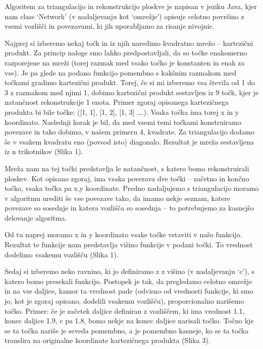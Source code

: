 \documentclass[a4paper,11pt]{article}
\begin{document}
Algoritem za triangulacijo in rekonstrukcijo ploskve je napisan v jeziku Java, kjer nam class `Network' (v nadaljevanju kot `omrežje') opisuje celotno površino z vsemi vozlišči in povezavami, ki jih uporabljamo za risanje nivojnic.
\par
Najprej si izberemo nekaj točk in iz njih naredimo kvadratno mrežo – kartezični produkt. Za princip naloge smo lahko predpostavljali, da so točke enakomerno razporejene na mreži (torej razmak med vsako točko je konstanten in enak za vse). Je pa glede na podano funkcijo pomembno s kakšnim razmakom med točkami gradimo kartezični produkt. Torej, če si mi izberemo vsa števila od 1 do 3 z razmakom med njimi 1, dobimo kartezični produkt sestavljen iz 9 točk, kjer je natančnost rekonstrukcije 1 enota. Primer zgoraj opisanega kartezičnega produkta bi bile točke: ([1, 1], [1, 2], [1, 3] ….). Vsaka točka ima torej x in y koordinato. Naslednji korak je bil, da med vsemi temi točkami konstruiramo povezave in tako dobimo, v našem primeru 4, kvadrate. Za triangulacijo dodamo še v vsakem kvadratu eno (povsod isto) diagonalo. Rezultat je mreža sestavljena iz n trikotnikov (Slika 1).


Mreža nam na tej točki predstavlja le natančnost, s katero bomo rekonstruirali ploskev. Kot opisano zgoraj, ima vsaka povezava dve točki – začetno in končno točko, vsaka točka pa x,y koordinate. Predno nadaljujemo s triangulacijo moramo v algoritmu urediti še vse povezave tako, da imamo nekje seznam, katere povezave so sosednje in katera vozlišča so sosednja – to potrebujemo za kasnejšo delovanje algoritma.


Od tu naprej moramo x in y koordinato vsake točke vstaviti v našo funkcijo. Rezultat te funkcije nam predstavlja višino funkcije v podani točki. To vrednost dodelimo vsakemu vozlišču (Slika 1).
\par
Sedaj si izberemo neko ravnino, ki jo definiramo z z višino (v nadaljevanju `c'), s katero bomo presekali funkcijo. Postopek je tak, da pregledamo celotno omrežje in na vse daljice, kamor ta vrednost pade (odvisno od vrednosti funkcije, ki smo jo, kot je zgoraj opisano, dodelili vsakemu vozlišču), proporcionalno narišemo točko. Primer: če je začetek daljice definiran z vozliščem, ki ima vrednost 1.1, konec daljice 1.9, c pa 1.8, bomo nekje na konec daljice narisali točko. Točno kje se ta točka nariše je seveda pomembno, a je pomembno kasneje, ko se ta točka translira na originalne koordinate kartezičnega produkta (Slika 3).
\end{document}
